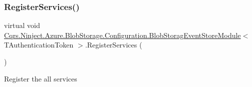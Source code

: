 \subsubsection{\texorpdfstring{Register\+Services()}{RegisterServices()}}
{\footnotesize\ttfamily virtual void \hyperlink{classCqrs_1_1Ninject_1_1Azure_1_1BlobStorage_1_1Configuration_1_1BlobStoragEventStoreModule}{Cqrs.\+Ninject.\+Azure.\+Blob\+Storage.\+Configuration.\+Blob\+Storag\+Event\+Store\+Module}$<$ T\+Authentication\+Token $>$.Register\+Services (\begin{DoxyParamCaption}{ }\end{DoxyParamCaption})\hspace{0.3cm}{\ttfamily [virtual]}}



Register the all services 

